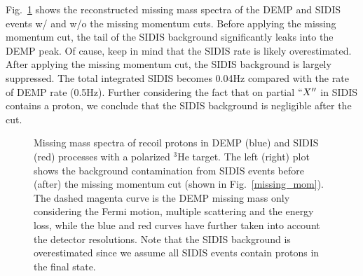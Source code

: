 Fig.~\ref{missing_mass} shows the reconstructed missing mass spectra of the
DEMP and SIDIS events w/ and w/o the missing momentum cuts. Before applying the
missing momentum cut, the tail of the SIDIS background significantly leaks into
the DEMP peak. Of cause, keep in mind that the SIDIS rate is likely
overestimated.  After applying the missing momentum cut, the SIDIS background
is largely suppressed.  The total integrated SIDIS becomes 0.04Hz compared with
the rate of DEMP rate (0.5Hz).  Further considering the fact that on partial
$``X''$ in SIDIS contains a proton, we conclude that the SIDIS background is
negligible after the cut.
\begin{figure}[!ht]
 \begin{center}
   \caption[Missing Mass]{\footnotesize{Missing mass spectra of recoil protons
       in DEMP (blue) and SIDIS (red) processes with a polarized $^{3}$He
       target. The left (right) plot shows the background contamination from
       SIDIS events before (after) the missing momentum cut (shown in
       Fig.~\ref{missing_mom}).  The dashed magenta curve is the DEMP missing
       mass only considering the Fermi motion, multiple scattering and the
       energy loss, while the blue and red curves have further taken into
       account the detector resolutions. Note that the SIDIS background is
       overestimated since we assume all SIDIS events contain protons in the
       final state. }}
  \label{missing_mass}
  \end{center}
\end{figure}

